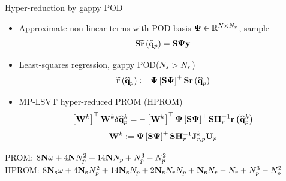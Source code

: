 \documentclass[]{beamer}
\begin{document}
\begin{frame}{Hyper-reduction by gappy POD}
    \begin{itemize}
		\item Approximate non-linear terms with POD basis $\deimBasis \in \mathbb{R}^{\numDOF \times \numResModes}$, sample
		\begin{equation*}
			\sampMat \resApproxFunc{\primVecCoef} = \sampMat \deimBasis \dummyVec
		\end{equation*}
		\item Least-squares regression, gappy POD\footnotemark[7] ($N_s > N_r$)
		\begin{equation*}
			\resApproxFunc{\primVecCoef} \defEq \deimBasis \left[ \sampMat \deimBasis \right]^{+} \sampMat \resFunc{\primVecCoef}
		\end{equation*}
		\item MP-LSVT hyper-reduced PROM (HPROM)
		\begin{equation*}
			\left[ \testBasis^\newtonIdx \right]^\top \testBasis^\newtonIdx \delta \primVecCoef^{\newtonIdx} = -\left[\testBasis^\newtonIdx \right]^\top \deimBasis \left[ \sampMat \deimBasis \right]^{+} \sampMat \resScaleInv \resFunc{\primVecCoef^{\newtonIdx}}
		\end{equation*}
		\begin{equation*}
			\testBasis^\newtonIdx \defEq \deimBasis \left[ \sampMat \deimBasis \right]^{+} \sampMat \resScaleInv \jacobResPrim^{\newtonIdx} \primTrial
		\end{equation*}
	\end{itemize}
	\begin{tcolorbox}[colframe=blue!50!white,halign=left]
		PROM: \; $8 \mathbf{N} \omega + 4 \mathbf{N} N_p^2 + 14 \mathbf{N} N_p + N_p^3 - N_p^2$ \\
		HPROM: $8 \mathbf{N_s} \omega + 4 \mathbf{N_s} N_p^2 + 14 \mathbf{N_s} N_p + 2 \mathbf{N_s} N_r N_p + \mathbf{N_s} N_r - N_r + N_p^3 - N_p^2$
	\end{tcolorbox}
\end{frame}
\end{document}
